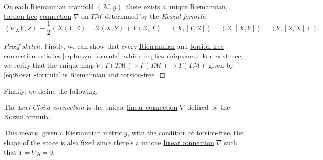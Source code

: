 \begin{theorem}\label{thm:Levi-Civita}
	On each \hyperref[def:Riemannian-manifold]{Riemannian manifold} \((\mathcal{M} , g)\), there exists a unique \hyperref[def:Riemannian]{Riemannian}, \hyperref[def:torsion-free]{torsion-free} \hyperref[def:linear-connection]{connection} \(\nabla \) on \(T\mathcal{M} \) determined by the \emph{Koszul formula}
	\begin{equation}\label{eq:Koszul-formula}
		\left\langle \nabla _X Y, Z \right\rangle = \frac{1}{2} \left( X \left\langle Y, Z \right\rangle - Z\left\langle X, Y \right\rangle + Y\left\langle Z, X \right\rangle - \left\langle X, [Y, Z] \right\rangle + \left\langle Z, [X, Y] \right\rangle + \left\langle Y, [Z, X] \right\rangle \right).
	\end{equation}
\end{theorem}
\begin{proof}[Proof sketch]
	Firstly, we can show that every \hyperref[def:Riemannian]{Riemannian} and \hyperref[def:torsion-free]{torsion-free} \hyperref[def:linear-connection]{connection} satisfies \autoref{eq:Koszul-formula}, which implies uniqueness. For existence, we verify that the unique map \(\nabla \colon \Gamma (T \mathcal{M} ) \times \Gamma (T \mathcal{M} )\to \Gamma (T\mathcal{M} )\) given by \autoref{eq:Koszul-formula} is \hyperref[def:Riemannian]{Riemannian} and \hyperref[def:torsion-free]{torsion-free}.
\end{proof}

Finally, we define the following.

\begin{definition}\label{def:Levi-Civita-connection}
	The \emph{Levi-Civita connection} is the unique \hyperref[def:linear-connection]{linear connection} \(\nabla \) defined by the \hyperref[eq:Koszul-formula]{Koszul formula}.
\end{definition}


\begin{remark}
	This means, given a \hyperref[def:Riemannian-metric]{Riemannian metric} \(g\), with the condition of \hyperref[def:torsion-free]{torsion-free}, the shape of the space is also fixed since there's a unique \hyperref[def:linear-connection]{linear connection} \(\nabla \) such that \(T = \nabla g = 0\).
\end{remark}
